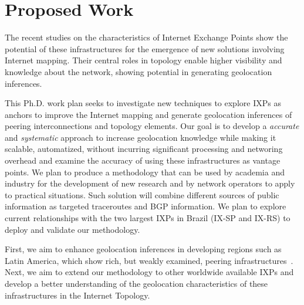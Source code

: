 \chapter{Proposed Work}\label{cap:proposal}
\thispagestyle{empty}


	The recent studies on the characteristics of Internet Exchange Points show the potential of these infrastructures for the emergence of new solutions involving Internet mapping. Their central roles in topology enable higher visibility and knowledge about the network, showing potential in generating geolocation inferences.

	This Ph.D. work plan seeks to investigate new techniques to explore IXPs as anchors to improve the Internet mapping and generate geolocation inferences of peering interconnections and topology elements. Our goal is to develop a \emph{accurate} and \emph{systematic} approach to increase geolocation knowledge while making it scalable, automatized, without incurring significant processing and networing overhead and examine the accuracy of using these infrastructures as vantage points. We plan to produce a methodology that can be used by academia and industry for the development of new research and by network operators to apply to practical situations. Such solution will combine different sources of public information as targeted traceroutes and BGP information. We plan to explore current relationships with the two largest IXPs in Brazil (IX-SP and IX-RS) to deploy and validate our methodology.

	First, we aim to enhance geolocation inferences in developing regions such as Latin America, which show rich, but weakly examined, peering infrastructures~\cite{IXbr, DissectingBrazilianIXP}. Next, we aim to extend our methodology to other worldwide available IXPs and develop a better understanding of the geolocation characteristics of these infrastructures in the Internet Topology.

